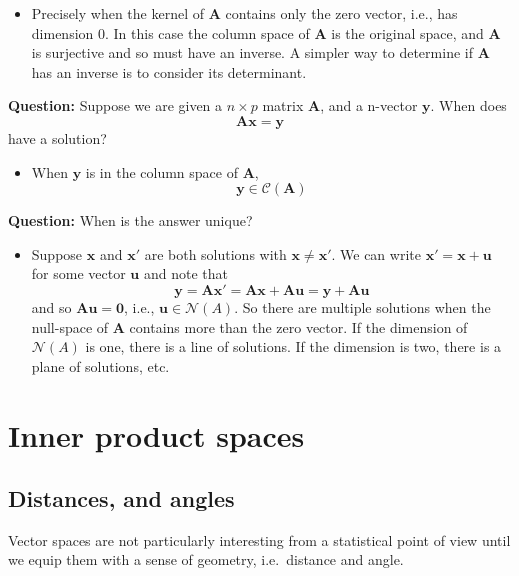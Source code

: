 \documentclass[
]{book}
\providecommand{\tightlist}{%
  \setlength{\itemsep}{0pt}\setlength{\parskip}{0pt}}
\theoremstyle{definition}
\theoremstyle{definition}
\theoremstyle{definition}
\theoremstyle{definition}
\theoremstyle{remark}
\begin{document}
\begin{itemize}
\tightlist
\item
  Precisely when the kernel of \(\mathbf A\) contains only the zero vector, i.e., has dimension 0. In this case the column space of \(\mathbf A\) is the original space, and \(\mathbf A\) is surjective and so must have an inverse. A simpler way to determine if \(\mathbf A\) has an inverse is to consider its determinant.
\end{itemize}

\textbf{Question:} Suppose we are given a \(n\times p\) matrix \(\mathbf A\), and a n-vector \(\mathbf y\). When does
\[\mathbf A\mathbf x= \mathbf y\]
have a solution?

\begin{itemize}
\tightlist
\item
  When \(\mathbf y\) is in the column space of \(\mathbf A\),
  \[\mathbf y\in \mathcal{C}(\mathbf A)\]
\end{itemize}

\textbf{Question:} When is the answer unique?

\begin{itemize}
\tightlist
\item
  Suppose \(\mathbf x\) and \(\mathbf x'\) are both solutions with \(\mathbf x\not =\mathbf x'\). We can write \(\mathbf x'=\mathbf x+\mathbf u\) for some vector \(\mathbf u\) and note that
  \[\mathbf y=\mathbf A\mathbf x' = \mathbf A\mathbf x+\mathbf A\mathbf u= \mathbf y+\mathbf A\mathbf u\]
  and so \(\mathbf A\mathbf u=\boldsymbol 0\), i.e., \(\mathbf u\in \mathcal{N}(A)\). So there are multiple solutions when the null-space of \(\mathbf A\) contains more than the zero vector. If the dimension of \(\mathcal{N}(A)\) is one, there is a line of solutions. If the dimension is two, there is a plane of solutions, etc.
\end{itemize}

\hypertarget{linalg-innerprod}{%
\section{Inner product spaces}\label{linalg-innerprod}}

\hypertarget{normed}{%
\subsection{Distances, and angles}\label{normed}}

Vector spaces are not particularly interesting from a statistical point of view until we equip them with a sense of geometry, i.e.~distance and angle.
\end{document}
